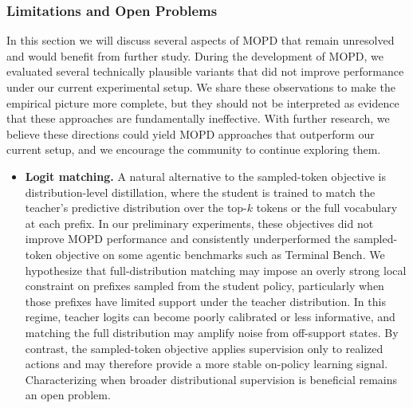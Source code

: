 \subsubsection{Limitations and Open Problems}
In this section we will discuss several aspects of MOPD that remain unresolved and would benefit from further study.
During the development of MOPD, we evaluated several technically plausible variants that did not improve performance under our current experimental setup. We share these observations to make the empirical picture more complete, but they should not be interpreted as evidence that these approaches are fundamentally ineffective. With further research, we believe these directions could yield MOPD approaches that outperform our current setup, and we encourage the community to continue exploring them.

\begin{itemize}
\item \textbf{Logit matching.}
A natural alternative to the sampled-token objective is distribution-level distillation, where the student is trained to match the teacher's predictive distribution over the top-$k$ tokens or the full vocabulary at each prefix. In our preliminary experiments, these objectives did not improve MOPD performance and consistently underperformed the sampled-token objective on some agentic benchmarks such as Terminal Bench. We hypothesize that full-distribution matching may impose an overly strong local constraint on prefixes sampled from the student policy, particularly when those prefixes have limited support under the teacher distribution. In this regime, teacher logits can become poorly calibrated or less informative, and matching the full distribution may amplify noise from off-support states. By contrast, the sampled-token objective applies supervision only to realized actions and may therefore provide a more stable on-policy learning signal. Characterizing when broader distributional supervision is beneficial remains an open problem.


\end{itemize}
